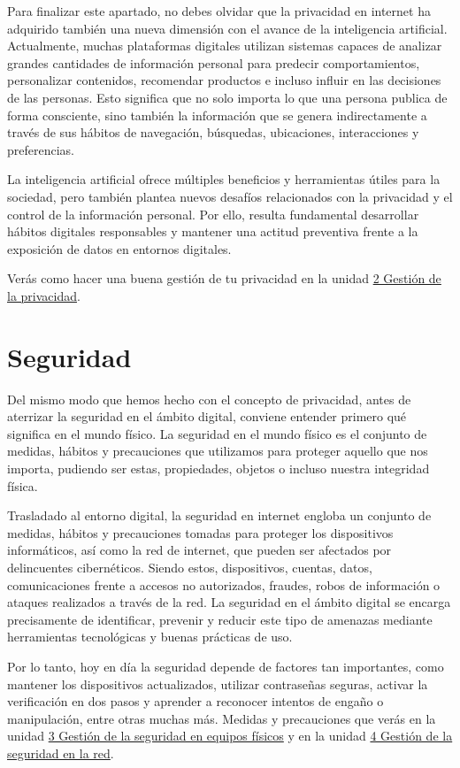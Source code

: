 \documentclass[
  spanish,
  a4paper,
  openany]{book}
\begin{document}
Para finalizar este apartado, no debes olvidar que la privacidad en internet ha adquirido también una nueva dimensión con el avance de la inteligencia artificial. Actualmente, muchas plataformas digitales utilizan sistemas capaces de analizar grandes cantidades de información personal para predecir comportamientos, personalizar contenidos, recomendar productos e incluso influir en las decisiones de las personas. Esto significa que no solo importa lo que una persona publica de forma consciente, sino también la información que se genera indirectamente a través de sus hábitos de navegación, búsquedas, ubicaciones, interacciones y preferencias.

La inteligencia artificial ofrece múltiples beneficios y herramientas útiles para la sociedad, pero también plantea nuevos desafíos relacionados con la privacidad y el control de la información personal. Por ello, resulta fundamental desarrollar hábitos digitales responsables y mantener una actitud preventiva frente a la exposición de datos en entornos digitales.

Verás como hacer una buena gestión de tu privacidad en la unidad \hyperref[gestiuxf3n-de-la-privacidad]{2 Gestión de la privacidad}.

\section{Seguridad}\label{seguridad}

Del mismo modo que hemos hecho con el concepto de privacidad, antes de aterrizar la seguridad en el ámbito digital, conviene entender primero qué significa en el mundo físico. La seguridad en el mundo físico es el conjunto de medidas, hábitos y precauciones que utilizamos para proteger aquello que nos importa, pudiendo ser estas, propiedades, objetos o incluso nuestra integridad física.

Trasladado al entorno digital, la seguridad en internet engloba un conjunto de medidas, hábitos y precauciones tomadas para proteger los dispositivos informáticos, así como la red de internet, que pueden ser afectados por delincuentes cibernéticos. Siendo estos, dispositivos, cuentas, datos, comunicaciones frente a accesos no autorizados, fraudes, robos de información o ataques realizados a través de la red. La seguridad en el ámbito digital se encarga precisamente de identificar, prevenir y reducir este tipo de amenazas mediante herramientas tecnológicas y buenas prácticas de uso.

Por lo tanto, hoy en día la seguridad depende de factores tan importantes, como mantener los dispositivos actualizados, utilizar contraseñas seguras, activar la verificación en dos pasos y aprender a reconocer intentos de engaño o manipulación, entre otras muchas más. Medidas y precauciones que verás en la unidad \hyperref[gestiuxf3n-de-la-seguridad-en-equipos-fuxedsicos]{3 Gestión de la seguridad en equipos físicos} y en la unidad \hyperref[gestiuxf3n-de-la-seguridad-en-la-red]{4 Gestión de la seguridad en la red}.
\end{document}
